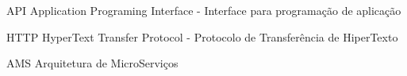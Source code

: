
\begin{siglas}
	\item[API]{Application Programing Interface - Interface para programação de aplicação}
	\item[HTTP]{HyperText Transfer Protocol - Protocolo de Transferência de HiperTexto}
	\item[AMS]{Arquitetura de MicroServiços}
\end{siglas}